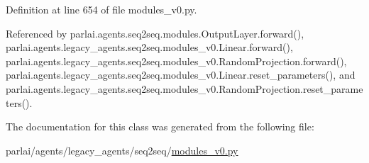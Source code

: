 Definition at line 654 of file modules\+\_\+v0.\+py.



Referenced by parlai.\+agents.\+seq2seq.\+modules.\+Output\+Layer.\+forward(), parlai.\+agents.\+legacy\+\_\+agents.\+seq2seq.\+modules\+\_\+v0.\+Linear.\+forward(), parlai.\+agents.\+legacy\+\_\+agents.\+seq2seq.\+modules\+\_\+v0.\+Random\+Projection.\+forward(), parlai.\+agents.\+legacy\+\_\+agents.\+seq2seq.\+modules\+\_\+v0.\+Linear.\+reset\+\_\+parameters(), and parlai.\+agents.\+legacy\+\_\+agents.\+seq2seq.\+modules\+\_\+v0.\+Random\+Projection.\+reset\+\_\+parameters().



The documentation for this class was generated from the following file\+:\begin{DoxyCompactItemize}
\item 
parlai/agents/legacy\+\_\+agents/seq2seq/\hyperlink{seq2seq_2modules__v0_8py}{modules\+\_\+v0.\+py}\end{DoxyCompactItemize}
